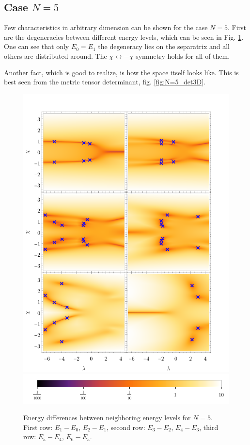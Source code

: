 \subsection{Case $N=5$}

Few characteristics in arbitrary dimension can be shown for the case $N=5$. First are the degeneracies between different energy levels, which can be seen in Fig. \ref{fig:singularitiesBetweenEnergiesN=6}. One can see that only $E_0=E_1$ the degeneracy lies on the separatrix and all others are distributed around. The $\chi\leftrightarrow-\chi$ symmetry holds for all of them. 

Another fact, which is good to realize, is how the space itself looks like. This is best seen from the metric tensor determinant, fig. \ref{fig:N=5_det3D}.



\begin{figure}[H]
    \centering
    \includegraphics[scale=1.3]{../img/singularitiesBetweenEnergiesN=6.pdf}
    \includegraphics[scale=1.3]{../img/N=5_bar6.pdf}
    \caption{Energy differences between neighboring energy levels for $N=5$. First row: $E_1-E_0$, $E_2-E_1$, second row: $E_3-E_2$, $E_4-E_3$, third row: $E_5-E_4$, $E_6-E_5$.}
    \label{fig:singularitiesBetweenEnergiesN=6}    
\end{figure}

